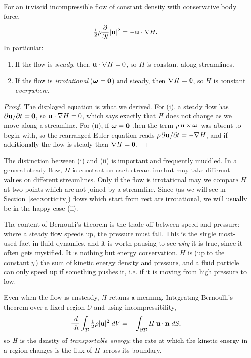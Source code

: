 \documentclass[a4paper]{scrartcl}
\newcommand{\pd}[2]{\frac{\partial #1}{\partial #2}}
\newcommand{\bom}{\boldsymbol{\omega}}
\begin{document}
\begin{theorem}
	For an inviscid incompressible flow of constant density with conservative body force,
	$$
	\tfrac{1}{2}\rho\pd{}{t}|\vv u|^2 = - \vv u \cdot \nabla H.
	$$
	In particular:
	\begin{enumerate}[label=(\roman*)]
		\item If the flow is \emph{steady}, then $\mathbf{u} \cdot \nabla H = 0$, so $H$ is constant along streamlines.
		\item If the flow is \emph{irrotational} ($\bom = \vv 0$) and steady, then $\nabla H = \mathbf{0}$, so $H$ is constant \emph{everywhere}.
	\end{enumerate}
\end{theorem}
\begin{proof}
	The displayed equation is what we derived. For (i), a steady flow has $\partial \mathbf{u}/\partial t = \mathbf{0}$, so $\mathbf{u} \cdot \nabla H = 0$, which says exactly that $H$ does not change as we move along a streamline. For (ii), if $\bom = \vv 0$ then the term $\rho \, \vv u \times \bom$ was absent to begin with, so the rearranged Euler equation reads $\rho \, \partial\mathbf{u}/\partial t = -\nabla H$, and if additionally the flow is steady then $\nabla H = \mathbf{0}$. \qedhere
\end{proof}

The distinction between (i) and (ii) is important and frequently muddled. In a general steady flow, $H$ is constant on each streamline but may take different values on different streamlines. Only if the flow is irrotational may we compare $H$ at two points which are not joined by a streamline. Since (as we will see in Section~\ref{sec:vorticity}) flows which start from rest are irrotational, we will usually be in the happy case (ii).

The content of Bernoulli's theorem is the trade-off between speed and pressure: where a steady flow speeds up, the pressure must fall. This is the single most-used fact in fluid dynamics, and it is worth pausing to see \emph{why} it is true, since it often gets mystified. It is nothing but energy conservation. $H$ is (up to the constant $\chi$) the sum of kinetic energy density and pressure, and a fluid particle can only speed up if something pushes it, i.e. if it is moving from high pressure to low.

\begin{remark}
	Even when the flow is unsteady, $H$ retains a meaning. Integrating Bernoulli's theorem over a fixed region $\DD$ and using incompressibility,
	$$
	\frac{\; d}{\; d t}\int_{\mathcal{D}} \tfrac{1}{2}\rho|\mathbf{u}|^2 \; d V = -\int_{\partial \mathcal{D}} H \, \mathbf{u} \cdot \mathbf{n} \; d S,
	$$
	so $H$ is the density of \emph{transportable energy}: the rate at which the kinetic energy in a region changes is the flux of $H$ across its boundary.
\end{remark}
\end{document}
